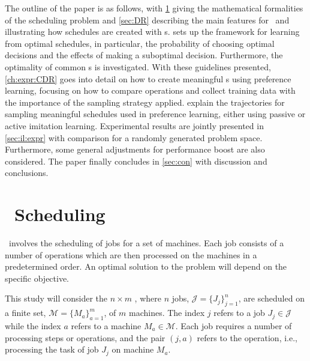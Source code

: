 \documentclass[twocolumn]{svjour3}
\begin{document}
The outline of the paper is as follows, with \cref{sec:problemdef} giving the 
mathematical formalities of the scheduling problem and 
\cref{sec:DR} describing the main features for \jsp\ 
and illustrating how schedules are created with \dr s. 
 sets up the framework for learning from optimal schedules,  
in particular, the probability of choosing optimal decisions and the effects of 
making a suboptimal decision. Furthermore, the optimality of common \sdr s is 
investigated.
With these guidelines presented, \cref{ch:expr:CDR} goes into detail on how to 
create 
meaningful \cdr s using preference learning, focusing on how to 
compare operations and collect training data with the importance of  the
sampling strategy applied. 
 explain the trajectories for 
sampling meaningful schedules used in preference learning, either 
using passive or active imitation learning. 
Experimental results are jointly presented in \cref{sec:il:expr} with 
comparison for a randomly generated problem space. 
Furthermore, some general adjustments for performance boost are also considered.
The paper finally concludes in \cref{sec:con} with discussion and conclusions.

\section{\Jsp~Scheduling}\label{sec:problemdef}
\JSP\ involves the scheduling of jobs for a set of 
machines. Each job consists of a number of operations which are then processed 
on the machines in a predetermined order. An optimal solution to the problem 
will depend on the specific objective. 

This study will consider the $n\times m$ \JSP, where $n$ jobs, 
$\mathcal{J}=\{J_j\}_{j=1}^n$, are scheduled on a finite set, 
$\mathcal{M}=\{M_a\}_{a=1}^m$, of $m$ machines. The index $j$ refers to a job 
$J_j\in\mathcal{J}$ while the index $a$ refers to a machine 
$M_a\in\mathcal{M}$. 
Each job requires a number of processing steps or operations, and the pair 
$(j,a)$ refers to the operation, i.e., processing the task of job $J_j$ on 
machine $M_a$. 
\end{document}
